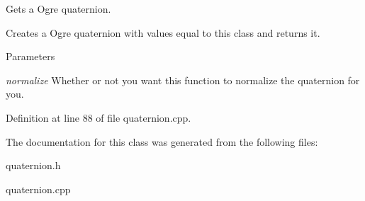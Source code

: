 Gets a Ogre quaternion. 

Creates a Ogre quaternion with values equal to this class and returns it. 
\begin{DoxyParams}{Parameters}
\item[{\em normalize}]Whether or not you want this function to normalize the quaternion for you. \end{DoxyParams}


Definition at line 88 of file quaternion.cpp.



The documentation for this class was generated from the following files:\begin{DoxyCompactItemize}
\item 
quaternion.h\item 
quaternion.cpp\end{DoxyCompactItemize}
